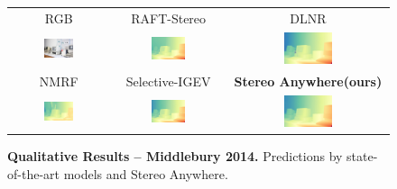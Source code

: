 \documentclass[10pt,twocolumn,letterpaper]{article}
\newcommand{\method}[0]{Stereo Anywhere\xspace}
\begin{document}
\begin{figure}[h]
\begin{tabular}{ccc}
        \small RGB &
        \small RAFT-Stereo \cite{lipson2021raft} &
        \small DLNR \cite{zhao2023high} \\
        \includegraphics[width=0.32\textwidth]{imgs/middlebury/rgb/14.jpg} &
        \includegraphics[width=0.32\textwidth]{imgs/middlebury/stereo/RAFT-Stereo/14.jpg} &
        \includegraphics[width=0.32\textwidth]{imgs/middlebury/stereo/DLNR/14.jpg} \\
        \small NMRF \cite{guan2024neural} &
        \small Selective-IGEV \cite{wang2024selective} &
        \textbf{\method (ours)} \\
        \includegraphics[width=0.32\textwidth]{imgs/middlebury/stereo/NMRF/14.jpg} &
        \includegraphics[width=0.32\textwidth]{imgs/middlebury/stereo/Selective/14.jpg} &
        \includegraphics[width=0.32\textwidth]{imgs/middlebury/stereo/Ours/14.jpg} \\
    \end{tabular}\vspace{-0.3cm}
    \caption{\textbf{Qualitative Results -- Middlebury 2014.} Predictions by state-of-the-art models and \method.}
    \label{fig:qual_midd14}\vspace{-0.3cm}
\end{figure}
\end{document}
